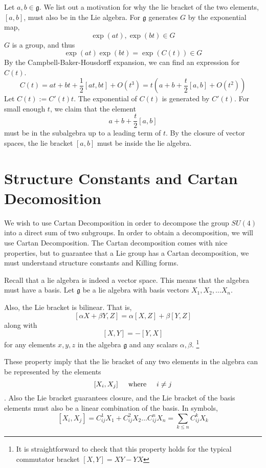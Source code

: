 \documentclass{article}
\newcommand{\textWhere}{
    {
        \hspace{5mm}
        \textrm{where}
        \hspace{5mm}
    }
}
\begin{document}
Let $a, b \in \mathfrak g$. We list out a motivation for why 
the lie bracket of the two elements, 
$[a, b]$, must also be in the Lie algebra. For $\mathfrak g$ 
generates $G$ by the exponential map, 
\[
    \exp(at) , \exp(bt) \in G
\]
$G$ is a group, and thus 
\[
    \exp(at) \exp(bt) = \exp(C(t)) \in G
\]
By the Campbell-Baker-Housdorff expansion, we can 
find an expression for $C(t)$. 
\[
    C(t) = at + bt + \frac 1 2 [at, bt] + O(t^3)
    = t\left(
        a + b + \frac t 2 [a, b] + O(t^2)
    \right)
\]
Let $C(t) := C'(t) t$. The exponential of $C(t)$ is generated 
by $C'(t)$. For small enough $t$, we claim that the element 
\[
    a + b + \frac t 2 [a, b]
\]
must be in the subalgebra up to a leading term of $t$. By 
the closure of vector spaces, the lie bracket $[a, b]$ must be 
inside the lie algebra. 



\section{Structure Constants and Cartan Decomosition}

We wish to use Cartan Decomposition in order to decompose 
the group $SU(4)$ into a direct sum of two subgroups. In order 
to obtain a decomposition, we will use Cartan Decomposition. 
The Cartan decomposition comes with nice properties, but to 
guarantee that a Lie group has a Cartan decomposition, we 
must understand structure constants and Killing forms. 

Recall that a lie algebra is indeed a vector space. 
This means that the algebra must have a basis. Let $\mathfrak g$ 
be a lie algebra with basis vectors $X_1, X_2 , \dots X_n$. 

Also, the Lie bracket is bilinear. That is, 
\[
    [\alpha X + \beta Y, Z] = \alpha [X, Z] + \beta[Y, Z]
\]
along with 
\[
    [X, Y] = -[Y, X]
\]
for any elements $x, y, z$ in the algebra $\mathfrak g$ and 
any scalars $\alpha, \beta$. 
\footnote{It is straightforward to check that this 
property holds for the typical commutator bracket $[X, Y] = XY - YX$}

These property imply that the lie bracket of any two elements 
in the algebra can be represented by the elements 
\[
    [X_i, X_j] \textWhere i \neq j
\]. Also the Lie bracket guarantees closure, and the Lie bracket 
of the basis elements must also be a linear combination of the basis. 
In symbols, 
\[
    [X_i, X_j] = C_{ij}^1X_1 + C_{ij}^2X_2 \dots C_{ij}^nX_n = \sum_{k \leq n} C_{ij}^k X_k
\]
\end{document}
